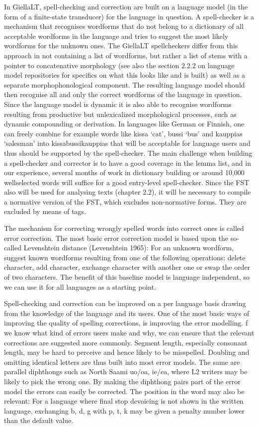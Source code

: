 \documentclass[free]{flammie}
\begin{document}
In GiellaLT, spell-checking and correction are built on a language model (in the form of a
finite-state transducer) for the language in question. A spell-checker is a mechanism that
recognises wordforms that do not belong to a dictionary of all acceptable wordforms in the
language and tries to suggest the most likely wordforms for the unknown ones. The
GiellaLT spellcheckers differ from this approach in not containing a list of wordforms, but
rather a list of stems with a pointer to concatenative morphology (see also the section 2.2.2
on language model repositories for specifics on what this looks like and is built) as well as
a separate morphophonological component. The resulting language model should then recognise all and only the correct wordforms of the language in question. Since the language
model is dynamic it is also able to recognise wordforms resulting from productive but unlexicalized morphological processes, such as dynamic compounding or derivation. In languages like German or Finnish, one can freely combine for example words like kissa ‘cat’,
bussi ‘bus’ and kauppias ‘salesman’ into kissabussikauppias that will be acceptable for
language users and thus should be supported by the spell-checker. The main challenge
when building a spell-checker and corrector is to have a good coverage in the lemma list,
and in our experience, several months of work in dictionary building or around 10,000 wellselected words will suffice for a good entry-level spell-checker. Since the FST also will be
used for analysing texts (chapter 2.2), it will be necessary to compile a normative version
of the FST, which excludes non-normative forms. They are excluded by means of tags.

The mechanism for correcting wrongly spelled words into correct ones is called error
correction. The most basic error correction model is based upon the so-called Levenshtein
distance (Levenshtein 1965): For an unknown wordform, suggest known wordforms resulting from one of the following operations: delete character, add character, exchange
character with another one or swap the order of two characters. The benefit of this baseline
model is language independent, so we can use it for all languages as a starting point.

Spell-checking and correction can be improved on a per language basis drawing from
the knowledge of the language and its users. One of the most basic ways of improving the
quality of spelling corrections, is improving the error modelling. f we know what kind of
errors users make and why, we can ensure that the relevant corrections are suggested more
commonly. Segment length, especially consonant length, may be hard to perceive and
hence likely to be misspelled. Doubling and omitting identical letters are thus built into
most error models. The same are parallel diphthongs such as North Saami uo/oa, ie/ea,
where L2 writers may be likely to pick the wrong one. By making the diphthong pairs part
of the error model the errors can easily be corrected. The position in the word may also be
relevant: For a language where final stop devoicing is not shown in the written language,
exchanging b, d, g with p, t, k may be given a penalty number lower than the default value.
\end{document}
